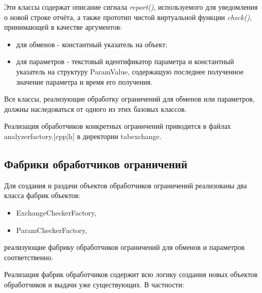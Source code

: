 Эти классы содержат описание сигнала \textit{report()}, используемого для 
уведомления о новой строке отчёта, а также прототип чистой виртуальной функции 
\textit{check()}, принимающей в качестве аргументов:

\begin{itemize}
 \item для обменов - константный указатель на объект;
 \item для параметров - текстовый идентификатор параметра и константный 
указатель на структуру ParamValue, содержащую последнее полученное значение 
параметра и время его получения.
\end{itemize}

Все классы, реализующие обработку ограничений для обменов или параметров, 
должны наследоваться от одного из этих базовых классов.

Реализация обработчиков конкретных ограничений приводится в файлах 
analyzerfactory.[cpp|h] в директории tabexchange.

\subsection{Фабрики обработчиков ограничений}

Для создания и раздачи объектов обработчиков ограничений реализованы два класса 
фабрик объектов:

\begin{itemize}
 \item ExchangeCheckerFactory,
 \item ParamCheckerFactory,
\end{itemize}

реализующие фабрику обработчиков ограничений для обменов и параметров 
соответственно.

Реализация фабрик обработчиков содержит всю логику создания новых объектов 
обработчиков и выдачи уже существующих. В частности:

